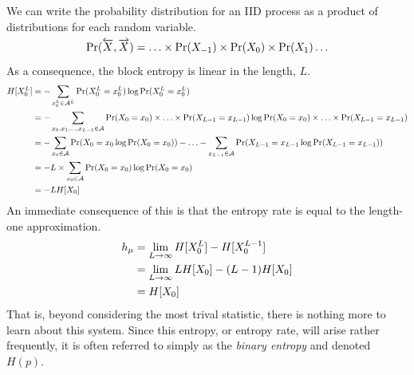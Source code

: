 We can write the probability distribution for an IID process as a product of distributions for each random variable.
\begin{align*}
\Pr(\smash{\overleftarrow {{X}}}, \smash{\overrightarrow{{X}}}) = \ldots \times \Pr({X}_{-1}) \times \Pr({X}_{0}) \times \Pr({X}_{1}) \ldots
\end{align*}
As a consequence, the block entropy is linear in the length, $L$.
\begin{align*}
H[{X}_0^L] &= -\sum_{{x}_0^L \in \mathcal{A}^L}\Pr({X}_0^L={x}_0^L) \log {\Pr( {X} _0^L= {x} _0^L)}\\
&= -\sum_{{x}_0, {x}_1,\ldots,{x}_{L-1} \in \mathcal{A}}\Pr({X}_0={x}_0) \times \ldots \times \Pr({X}_{L-1}={x}_{L-1}) \log {\Pr( {X} _0= {x} _0) \times \ldots \times \Pr( {X} _{L-1}= {x} _{L-1})}\\
&= -\sum_{x_0 \in \mathcal{A}}{\Pr({X}_0 = {x}_0 \log{\Pr( {X} _0 =  {x} _0)})} - \ldots 
-\sum_{x_{L-1} \in \mathcal{A}}{\Pr({X}_{L-1} = {x}_{L-1} \log{\Pr( {X} _{L-1} =  {x} _{L-1})})}\\
&= - L \times \sum_{x_0 \in \mathcal{A}}{\Pr({X}_0 = {x}_0) \log{\Pr( {X} _0 =  {x} _0)}}\\
&=-L H[{X}_0]
\end{align*}
An immediate consequence of this is that the entropy rate is equal to the length-one approximation.
\begin{align*}
h_\mu &= \lim_{L \to \infty}{H[{X}_0^{L}] - H[{X}_0^{L-1}]}\\
&= \lim_{L \to \infty}{L H[{X}_0] - (L-1)H[{X}_0]}\\
&= H[{X}_0]
\end{align*}
That is, beyond considering the most trival statistic, there is nothing more to learn about this system. Since this entropy, or entropy rate, will arise rather frequently, it is often referred to simply as the \emph{binary entropy} and denoted $H(p)$.


